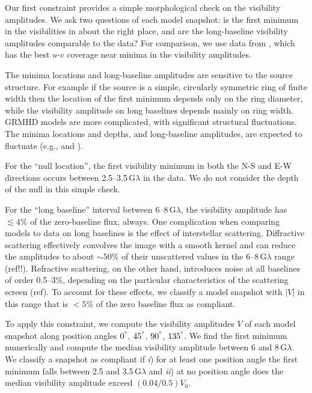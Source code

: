 Our first constraint provides a simple morphological check on the visibility amplitudes.
We ask two questions of each model snapshot: is the first minimum in the visibilities in about the right place,
and are the long-baseline visibility amplitudes comparable to the data?
For comparison, we use data from \aprilvii, which has the best $u$-$v$ coverage near minima in the visibility amplitudes.

The minima locations and long-baseline amplitudes are sensitive to the source structure.
For example if the source is a simple, circularly symmetric ring of finite width then the location of the first minimum depends only on the ring diameter, while the visibility amplitude on long baselines depends mainly on ring width.
GRMHD models are more complicated, with significant structural fluctuations.
The minima locations and depths, and long-baseline amplitudes, are expected to fluctuate (e.g., \citealt{2018ApJ...856..163M} and ).

For the ``null location'', the first visibility minimum in both the N-S and E-W directions occurs between 2.5--3.5\,G$\lambda$ in the data.
We do not consider the depth of the null in this simple check.

For the ``long baseline'' interval between 6--8\,G$\lambda$, the visibility amplitude has $\lesssim 4\%$ of the zero-baseline flux, always.
One complication when comparing models to data on long baselines is the effect of interstellar scattering.
Diffractive scattering effectively convolves the image with a smooth kernel and can reduce the amplitudes to about $\sim 50\%$ of their unscattered values in the 6--8\,G$\lambda$ range (ref!!).
Refractive scattering, on the other hand, introduces noise at all baselines of order 0.5--3\%, depending on the particular characteristics of the scattering screen (ref).  To account for these effects, we classify a model snapshot with $|V|$ in this range that is $< 5\%$ of the zero baseline flux as compliant.

To apply this constraint, we compute the visibility amplitudes $V$ of each model snapshot along position angles $0^\degree$, $45^\degree$, $90^\degree$, $135^\degree$.  We find the first minimum numerically and compute the median visibility amplitude between 6 and 8\,G$\lambda$.
We classify a snapshot as compliant if \emph{i}) for at least one position angle the first minimum falls between 2.5 and 3.5\,G$\lambda$ and \emph{ii}) at no position angle does the median visibility amplitude exceed $(0.04 / 0.5) V_0$.

